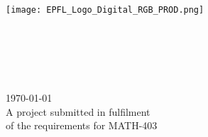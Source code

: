 \begin{titlepage}

\center %


\begin{figure*}
    \centering
    \texttt{[image: EPFL\_Logo\_Digital\_RGB\_PROD.png]}\\[1cm] 
\end{figure*}


\makeatletter
{ \huge \bfseries \thesistitle}\\[1.5cm] %
 


\ifdefined\authorid
\authorname\\ %
\authorid\\[2cm] %
\else
\authorname\\[2cm] %
\fi




{\large \today}\\[2cm] %

 
\vfill
 A project submitted in fulfilment\\of the requirements for MATH-403

\vfill %

\end{titlepage}